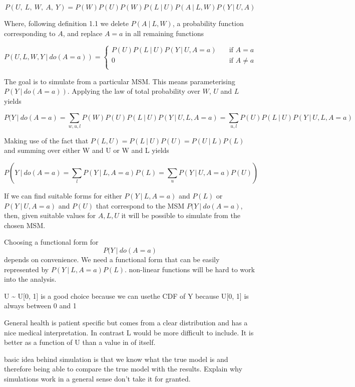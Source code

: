 \documentclass[11pt]{article}
\begin{document}
\[P(U,\ L,\ W,\ A,\ Y) = P(W)P(U)P(W)P(L\ |\ U)P(A\ |\ L,W)P(Y\ |\ U,A)\]

Where, following definition 1.1 we delete \(P(A\ |\ L,W)\), a
probability function corresponding to \(A\), and replace \(A=a\) in all
remaining functions

\[ P(U, L, W, Y\ |\ do(A=a)) =
  \begin{cases}
    P(U)P(L\ |\ U)P(Y\ |\ U,A = a) & \quad \text{if } A = a\\
    0  & \quad \text{if } A \neq a\\
  \end{cases}
\]

The goal is to simulate from a particular MSM. This means parameterising
\(P(Y\ |\ do(A=a))\). Applying the law of total probability over \(W\),
\(U\) and \(L\) yields

\[P(Y\ |\ do(A=a) = \sum_{w, u, l} P(W)P(U)P(L\ |\ U)P(Y\ |\ U, L, A=a) = \sum_{u, l} P(U)P(L\ |\ U)P(Y\ |\ U, L, A=a)\]

Making use of the fact that
\(P(L, U) = P(L\ |\  U)P(U) = P(U\ |\ L)P(L)\) and summing over either W
and U or W and L yields

\[P(Y\ |\ do(A=a) = \sum_{l}P(Y\ |\ L, A=a)P(L) = \sum_{u} P(Y\ |\ U, A=a)P(U))\]

If we can find suitable forms for either \(P(Y\ |\ L, A=a)\) and
\(P(L)\) or \(P(Y\ |\ U, A=a)\) and \(P(U)\) that correspond to the MSM
\(P(Y\ |\ do(A=a)\), then, given suitable values for \(A, L, U\) it will
be possible to simulate from the chosen MSM.

Choosing a functional form for \[P(Y\ |\ do(A=a)\] depends on
convenience. We need a functional form that can be easily represented by
\(P(Y\ |\ L, A=a)P(L)\). non-linear functions will be hard to work into
the analysis.

U \textasciitilde{} U{[}0, 1{]} is a good choice because we can usethe
CDF of Y because U{[}0, 1{]} is always between 0 and 1

General health is patient specific but comes from a clear distribution
and has a nice medical interpretation. In contrast L would be more
difficult to include. It is better as a function of U than a value in of
itself.

basic idea behind simulation is that we know what the true model is and
therefore being able to compare the true model with the results. Explain
why simulations work in a general sense don't take it for granted.
\end{document}
